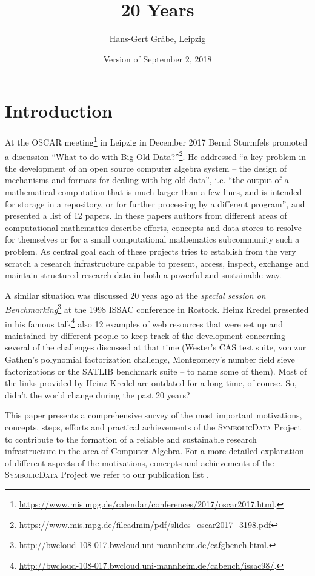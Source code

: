 \documentclass[a4paper,11pt]{article}
\title{20 Years {\SD}}
\author{Hans-Gert Gr\"abe, Leipzig}
\date{Version of September 2, 2018}
\makeatletter
\def\SD{\textsc{SymbolicData}}
\newcommand{\vorspann}{
\Aufsatz
{20 Years {\SD} Project}
{20 Years {\SD} Project}
{H.-G.\ Gr\"abe}
{graebe}
{H.-G.\ Gr\"abe, Leipzig University}
{graebe.jpg}
{graebe@informatik.uni-leipzig.de}

}
\makeatother
\begin{document}
\maketitle

\section{Introduction}

At the OSCAR
meeting\footnote{\url{https://www.mis.mpg.de/calendar/conferences/2017/oscar2017.html}.}
in Leipzig in December 2017 Bernd Sturmfels promoted a discussion ``What to do
with Big Old
Data?''\footnote{\url{https://www.mis.mpg.de/fileadmin/pdf/slides_oscar2017_3198.pdf}}.
He addressed ``a key problem in the development of an open source computer
algebra system -- the design of mechanisms and formats for dealing with big old
data'', i.e. ``the output of a mathematical computation that is much larger
than a few lines, and is intended for storage in a repository, or for further
processing by a different program'', and presented a list of 12 papers. In
these papers authors from different areas of computational mathematics describe
efforts, concepts and data stores to resolve for themselves or for a small
computational mathematics subcommunity such a problem.  As central goal each of
these projects tries to establish from the very scratch a research
infrastructure capable to present, access, inspect, exchange and maintain
structured research data in both a powerful and sustainable way.

A similar situation was discussed 20 yeas ago at the \emph{special session on
  Benchmarking}\footnote{\url{http://bwcloud-108-017.bwcloud.uni-mannheim.de/cafgbench.html}.}
at the 1998 ISSAC conference in Rostock.  Heinz Kredel presented in his famous
talk\footnote{\url{http://bwcloud-108-017.bwcloud.uni-mannheim.de/cabench/issac98/}.}
also 12 examples of web resources that were set up and maintained by different
people to keep track of the development concerning several of the challenges
discussed at that time (Wester's CAS test suite, von zur Gathen's polynomial
factorization challenge, Montgomery's number field sieve factorizations or the
SATLIB benchmark suite -- to name some of them). Most of the links provided by
Heinz Kredel are outdated for a long time, of course.  So, didn't the world
change during the past 20 years?

This paper presents a comprehensive survey of the most important motivations,
concepts, steps, efforts and practical achievements of the {\SD} Project to
contribute to the formation of a reliable and sustainable research
infrastructure in the area of Computer Algebra.  For a more detailed
explanation of different aspects of the motivations, concepts and achievements
of the {\SD} Project we refer to our publication list \cite{sdpub}.
\end{document}
